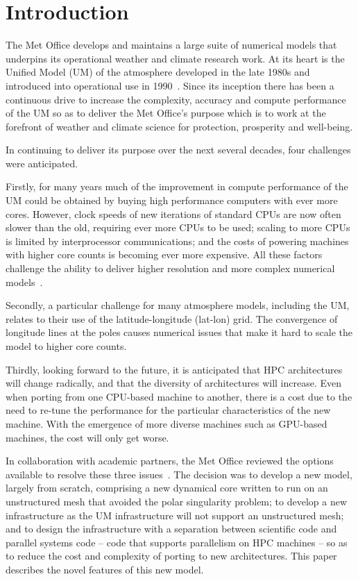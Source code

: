 \documentclass[review,times]{elsarticle}
\begin{document}
\newpage
\section{\label{sec:intro}Introduction}

The Met Office develops and maintains a large suite of numerical
models that underpins its operational weather and climate research
work. At its heart is the Unified Model (UM) of the atmosphere
developed in the late 1980s and introduced into operational use in
1990~\cite{gmd-10-1487-2017}. Since its inception there has been a
continuous drive to increase the complexity, accuracy and compute
performance of the UM so as to deliver the Met Office's purpose which
is to work at the forefront of weather and climate science for
protection, prosperity and well-being.

In continuing to deliver its purpose over the next several decades,
four challenges were anticipated.

Firstly, for many years much of the improvement in compute performance
of the UM could be obtained by buying high performance computers with
ever more cores. However, clock speeds of new iterations of standard
CPUs are now often slower than the old, requiring ever more CPUs to be
used; scaling to more CPUs is limited by interprocessor
communications; and the costs of powering machines with higher core
counts is becoming ever more expensive. All these factors challenge
the ability to deliver higher resolution and more complex numerical
models~\cite{gmd-2017-186}.

Secondly, a particular challenge for many atmosphere models, including
the UM, relates to their use of the latitude-longitude (lat-lon) grid.
The convergence of longitude lines at the poles causes numerical
issues that make it hard to scale the model to higher core counts.

Thirdly, looking forward to the future, it is anticipated that HPC
architectures will change radically, and that the diversity of
architectures will increase. Even when porting from one CPU-based
machine to another, there is a cost due to the need to re-tune the
performance for the particular characteristics of the new
machine. With the emergence of more diverse machines such as GPU-based
machines, the cost will only get worse.

In collaboration with academic partners, the Met Office reviewed the
options available to resolve these three issues~\cite{GHP1_CSR}. The
decision was to develop a new model, largely from scratch, comprising
a new dynamical core written to run on an unstructured mesh that
avoided the polar singularity problem; to develop a new infrastructure
as the UM infrastructure will not support an unstructured mesh; and to
design the infrastructure with a separation between scientific code
and parallel systems code -- code that supports parallelism on HPC
machines -- so as to reduce the cost and complexity of porting to new
architectures. This paper describes the novel features of this new model.
\end{document}

